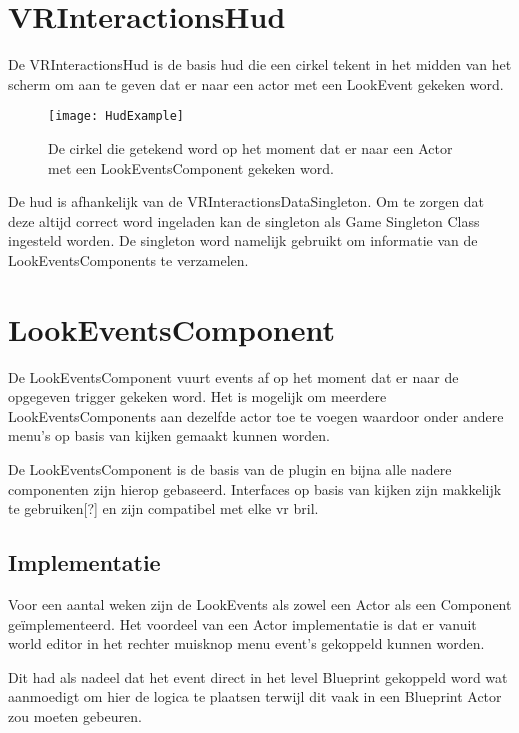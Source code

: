 \section{VRInteractionsHud}
De VRInteractionsHud is de basis \gls{hud} die een cirkel tekent in het midden van het scherm om aan te geven dat er naar een actor met een LookEvent gekeken word.

\begin{figure}[H]
  \centering
    \texttt{[image: HudExample]}
    \caption{De cirkel die getekend word op het moment dat er naar een Actor met een LookEventsComponent gekeken word.}
\end{figure}

De \gls{hud} is afhankelijk van de VRInteractionsDataSingleton. Om te zorgen dat deze altijd correct word ingeladen kan de singleton als Game Singleton Class ingesteld worden. De singleton word namelijk gebruikt om informatie van de LookEventsComponents te verzamelen.

\section{LookEventsComponent}
De LookEventsComponent vuurt events af op het moment dat er naar de opgegeven trigger gekeken word. Het is mogelijk om meerdere LookEventsComponents aan dezelfde actor toe te voegen waardoor onder andere menu's op basis van kijken gemaakt kunnen worden.

De LookEventsComponent is de basis van de plugin en bijna alle nadere componenten zijn hierop gebaseerd. Interfaces op basis van kijken zijn makkelijk te gebruiken[?] en zijn compatibel met elke \gls{vr} bril.


\subsection{Implementatie}
Voor een aantal weken zijn de LookEvents als zowel een Actor als een Component geïmplementeerd. Het voordeel van een Actor implementatie is dat er vanuit world editor in het rechter muisknop menu event's gekoppeld kunnen worden.


Dit had als nadeel dat het event direct in het level Blueprint gekoppeld word wat aanmoedigt om hier de logica te plaatsen terwijl dit vaak in een Blueprint Actor zou moeten gebeuren.

